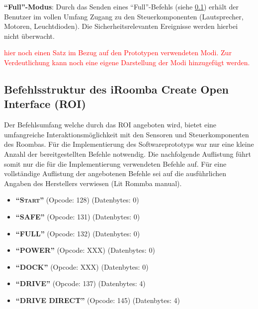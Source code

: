 \textbf{\enquote{Full}-Modus}: Durch das Senden eines \enquote{Full}-Befehls (siehe \ref{subsction:befehlsstruktur}) erhält der Benutzer im vollen Umfang Zugang zu den Steuerkomponenten (Lautsprecher, Motoren, Leuchtdioden). Die Sicherheitsrelevanten Ereignisse werden hierbei nicht überwacht.

\textcolor{red}{hier noch einen Satz im Bezug auf den Prototypen  verwendeten Modi. Zur Verdeutlichung kann noch eine eigene Darstellung der Modi hinzugefügt werden. }


\subsection{Befehlsstruktur des iRoomba Create Open Interface (ROI)}
\label{subsction:befehlsstruktur}
Der Befehlsumfang welche durch das ROI angeboten wird, bietet eine umfangreiche Interaktionsmöglichkeit mit den Sensoren und Steuerkomponenten des Roombas. Für die Implementierung des Softwareprototyps war nur eine kleine Anzahl der bereitgestellten Befehle notwendig. Die nachfolgende Auflistung führt somit nur die für die Implementierung verwendeten Befehle auf. Für eine vollständige Auflistung der angebotenen Befehle sei auf die ausführlichen Angaben des Herstellers verwiesen (Lit Rommba manual). 

\begin{itemize}
\item \textbf{\enquote{\textsc{Start}}} (Opcode: 128) (Datenbytes: 0)
\item \textbf{\enquote{SAFE}} (Opcode: 131) (Datenbytes: 0)
\item \textbf{\enquote{FULL}} (Opcode: 132) (Datenbytes: 0)
\item \textbf{\enquote{POWER}} (Opcode: XXX) (Datenbytes: 0)
\item \textbf{\enquote{DOCK}} (Opcode: XXX) (Datenbytes: 0)
\item \textbf{\enquote{DRIVE}} (Opcode: 137) (Datenbytes: 4)
\item \textbf{\enquote{DRIVE DIRECT}} (Opcode: 145) (Datenbytes: 4)
\end{itemize}

